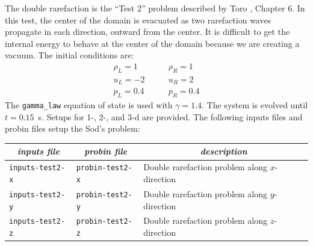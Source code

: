 The double rarefaction is the ``Test 2'' problem described by Toro
\cite{toro:1997}, Chapter 6.  In this test, the center of the domain
is evacuated as two rarefaction waves propagate in each direction, outward
from the center.  It is difficult to get the internal energy to 
behave at the center of the domain because we are creating a vacuum.
The initial conditions are:
\begin{equation}
\begin{array}{l}
\rho_L = 1 \\
u_L = -2 \\
p_L = 0.4
\end{array}
\qquad
\begin{array}{l}
\rho_R = 1 \\
u_R = 2 \\
p_R = 0.4
\end{array}
\end{equation}
The {\tt gamma\_law} equation of state is used with $\gamma = 1.4$.
The system is evolved until $t = 0.15$~s.  Setups for 1-, 2-, and 3-d
are provided.  The following inputs files and probin files setup the
Sod's problem:
\begin{table}[h]
\centering
\begin{tabular}{|l|l|l|} \hline
\multicolumn{1}{|c}{\em inputs file} &  \multicolumn{1}{|c}{\em probin file} & \multicolumn{1}{|c|}{\em description} \\
\hline
{\tt inputs-test2-x} & {\tt probin-test2-x} & Double rarefaction problem along $x$-direction \\
{\tt inputs-test2-y} & {\tt probin-test2-y} & Double rarefaction problem along $y$-direction \\
{\tt inputs-test2-z} & {\tt probin-test2-z} & Double rarefaction problem along $z$-direction \\
\hline
\end{tabular}
\label{Table:Sod}
\end{table}

